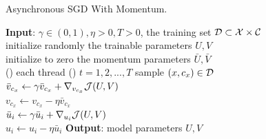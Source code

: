 \begin{algorithm2e}[htb]
\caption{Asynchronous SGD With Momentum.}
\label{alg:asgd}
  \textbf{Input}: $\gamma \in (0, 1), \eta > 0, T > 0$, 
  the training set $\mathcal{D} \subset \mathcal{X} \times \mathcal{C}$ \\
  initialize randomly the trainable parameters $U, V$ \\
  initialize to zero the momentum parameters $\bar U, \bar V$ \\
  \For() {each thread} {
    \For() {$t=1,2,...,T$} {
	    sample $(x, c_x) \in \mathcal{D}$ \\
	    $\bar v_{c_x} \gets \gamma \bar v_{c_x} + \nabla_{v_{c_x}} \mathcal{J}(U, V)$ \\
	    \label{stp:asgd-update-begin}
	    \label{stp:asgd-v-momentum}
	    $v_{c_x} \gets v_{c_x} - \eta \bar v_{c_x}$ \\
	     {
	    	$\bar u_i \gets \gamma \bar u_i + \nabla_{u_i} \mathcal{J}(U, V)$ \\
		    \label{stp:asgd-u-momentum}
	    	$u_i \gets u_i - \eta \bar u_i$
	    }
	    \label{stp:asgd-update-end}
    }
  }
  \textbf{Output}: model parameters $U, V$
\end{algorithm2e}
























